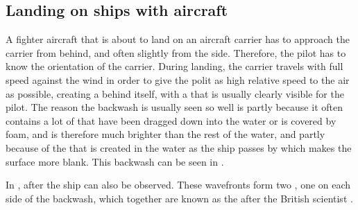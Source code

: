 \subsection{Landing on ships with aircraft}

A fighter aircraft that is about to land on an aircraft carrier has to approach the carrier from behind, and often slightly from the side. Therefore, the pilot has to know the orientation of the carrier. During landing, the carrier travels with full speed against the wind in order to give the polit as high relative speed to the air as possible, creating a \wake behind itself, with a \backwash that is usually clearly visible for the pilot. The reason the backwash is usually seen so well is partly because it often contains a lot of  that have been dragged down into the water or is covered by foam, and is therefore much brighter than the rest of the water, and partly because of the \turbulence that is created in the water as the ship passes by which makes the surface more blank. This backwash can be seen in .

In ,  after the ship can also be observed. These wavefronts form two , one on each side of the backwash, which together are known as the  after the British scientist .

